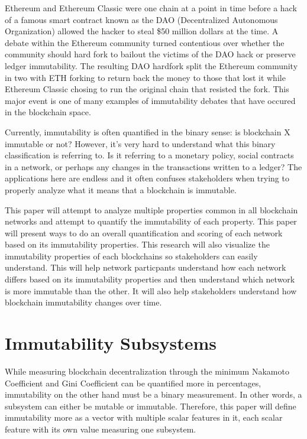 \documentclass{article}
\begin{document}
Ethereum\cite{ethpaper} and Ethereum Classic\cite{etcdec} were one chain at a point in time before a hack\cite{daohack} of a famous smart contract known as the DAO (Decentralized Autonomous Organization) allowed the hacker to steal \$50 million dollars at the time. A debate within the Ethereum community turned contentious over whether the community should hard fork to bailout the victims of the DAO hack or preserve ledger immutability. The resulting DAO hardfork\cite{daofork} split the Ethereum community in two with ETH forking to return back the money to those that lost it while Ethereum Classic chosing to run the original chain that resisted the fork. This major event is one of many examples of immutability debates that have occured in the blockchain space.

Currently, immutability is often quantified in the binary sense: is blockchain X immutable or not? However, it's very hard to understand what this binary classification is referring to. Is it referring to a monetary policy, social contracts in a network, or perhaps any changes in the transactions written to a ledger? The applications here are endless and it often confuses stakeholders when trying to properly analyze what it means that a blockchain is immutable.

This paper will attempt to analyze multiple properties common in all blockchain networks and attempt to quantify the immutability of each property. This paper will present ways to do an overall quantification and scoring of each network based on its immutability properties. This research will also visualize the immutability properties of each blockchains so stakeholders can easily understand. This will help network particpants understand how each network differs based on its immutability properties and then understand which network is more immutable than the other. It will also help stakeholders understand how blockchain immutability changes over time.

\section{Immutability Subsystems}
\label{sec:headings}
While measuring blockchain decentralization\cite{quantdecent} through the minimum Nakamoto Coefficient and Gini Coefficient can be quantified more in percentages, immutability on the other hand must be a binary measurement. In other words, a subsystem can either be mutable or immutable. Therefore, this paper will define immutability more as a vector with multiple scalar features in it, each scalar feature with its own value measuring one subsystem.
\end{document}
